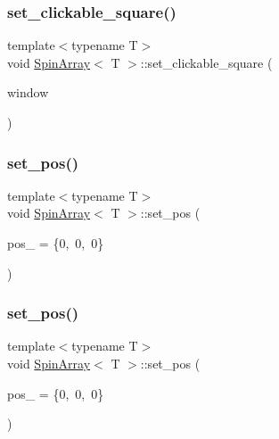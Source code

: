 \subsubsection{\texorpdfstring{set\+\_\+clickable\+\_\+square()}{set\_clickable\_square()}\hspace{0.1cm}{\footnotesize\ttfamily [3/3]}}
{\footnotesize\ttfamily template$<$typename T$>$ \\
void \mbox{\hyperlink{classSpinArray}{Spin\+Array}}$<$ T $>$\+::set\+\_\+clickable\+\_\+square (\begin{DoxyParamCaption}\item[{G\+L\+F\+Wwindow $\ast$}]{window }\end{DoxyParamCaption})\hspace{0.3cm}{\ttfamily [inline]}}

\mbox{\label{classSpinArray_a904e68a8b76d7da16140a0352ae04dfa}} 
\subsubsection{\texorpdfstring{set\+\_\+pos()}{set\_pos()}\hspace{0.1cm}{\footnotesize\ttfamily [1/4]}}
{\footnotesize\ttfamily template$<$typename T$>$ \\
void \mbox{\hyperlink{classSpinArray}{Spin\+Array}}$<$ T $>$\+::set\+\_\+pos (\begin{DoxyParamCaption}\item[{glm\+::vec3}]{pos\+\_\+ = {\ttfamily \{0,~0,~0\}} }\end{DoxyParamCaption})\hspace{0.3cm}{\ttfamily [inline]}}

\mbox{\label{classSpinArray_a904e68a8b76d7da16140a0352ae04dfa}} 
\subsubsection{\texorpdfstring{set\+\_\+pos()}{set\_pos()}\hspace{0.1cm}{\footnotesize\ttfamily [2/4]}}
{\footnotesize\ttfamily template$<$typename T$>$ \\
void \mbox{\hyperlink{classSpinArray}{Spin\+Array}}$<$ T $>$\+::set\+\_\+pos (\begin{DoxyParamCaption}\item[{glm\+::vec3}]{pos\+\_\+ = {\ttfamily \{0,~0,~0\}} }\end{DoxyParamCaption})\hspace{0.3cm}{\ttfamily [inline]}}

